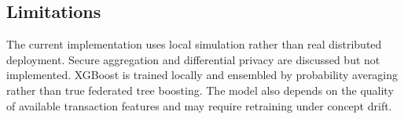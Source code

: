 \subsection{Limitations}
The current implementation uses local simulation rather than real distributed deployment. Secure aggregation and differential privacy are discussed but not implemented. XGBoost is trained locally and ensembled by probability averaging rather than true federated tree boosting. The model also depends on the quality of available transaction features and may require retraining under concept drift.
